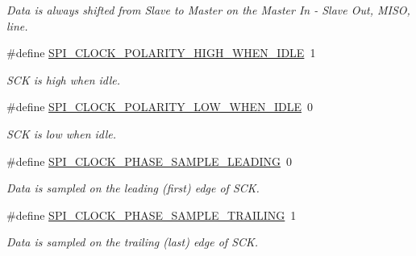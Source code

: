 \begin{DoxyCompactItemize}
\begin{DoxyCompactList}\small\item\em Data is always shifted from Slave to Master on the Master In -\/ Slave Out, M\-I\-S\-O, line. \end{DoxyCompactList}\item 
\hypertarget{group__spi_ga22bf096e260ed2f6ba648d957e0bc863}{\#define \hyperlink{group__spi_ga22bf096e260ed2f6ba648d957e0bc863}{S\-P\-I\-\_\-\-C\-L\-O\-C\-K\-\_\-\-P\-O\-L\-A\-R\-I\-T\-Y\-\_\-\-H\-I\-G\-H\-\_\-\-W\-H\-E\-N\-\_\-\-I\-D\-L\-E}~1}\label{group__spi_ga22bf096e260ed2f6ba648d957e0bc863}

\begin{DoxyCompactList}\small\item\em S\-C\-K is high when idle. \end{DoxyCompactList}\item 
\hypertarget{group__spi_ga5d3f3697c507a10a89c4759539b813b0}{\#define \hyperlink{group__spi_ga5d3f3697c507a10a89c4759539b813b0}{S\-P\-I\-\_\-\-C\-L\-O\-C\-K\-\_\-\-P\-O\-L\-A\-R\-I\-T\-Y\-\_\-\-L\-O\-W\-\_\-\-W\-H\-E\-N\-\_\-\-I\-D\-L\-E}~0}\label{group__spi_ga5d3f3697c507a10a89c4759539b813b0}

\begin{DoxyCompactList}\small\item\em S\-C\-K is low when idle. \end{DoxyCompactList}\item 
\hypertarget{group__spi_gaad532b376369ae3bcaf7fdee20b70dba}{\#define \hyperlink{group__spi_gaad532b376369ae3bcaf7fdee20b70dba}{S\-P\-I\-\_\-\-C\-L\-O\-C\-K\-\_\-\-P\-H\-A\-S\-E\-\_\-\-S\-A\-M\-P\-L\-E\-\_\-\-L\-E\-A\-D\-I\-N\-G}~0}\label{group__spi_gaad532b376369ae3bcaf7fdee20b70dba}

\begin{DoxyCompactList}\small\item\em Data is sampled on the leading (first) edge of S\-C\-K. \end{DoxyCompactList}\item 
\hypertarget{group__spi_ga53ba425a33999d91784c3c90c7973344}{\#define \hyperlink{group__spi_ga53ba425a33999d91784c3c90c7973344}{S\-P\-I\-\_\-\-C\-L\-O\-C\-K\-\_\-\-P\-H\-A\-S\-E\-\_\-\-S\-A\-M\-P\-L\-E\-\_\-\-T\-R\-A\-I\-L\-I\-N\-G}~1}\label{group__spi_ga53ba425a33999d91784c3c90c7973344}

\begin{DoxyCompactList}\small\item\em Data is sampled on the trailing (last) edge of S\-C\-K. \end{DoxyCompactList}\end{DoxyCompactItemize}

